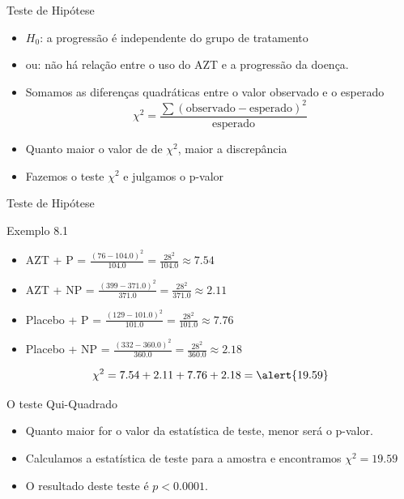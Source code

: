 \documentclass{beamer}
\begin{document}
\begin{frame}{Teste de Hipótese}
  \begin{itemize}
    \small
  \item $H_0$: a progressão é independente do grupo de tratamento
  \item ou: não há relação entre o uso do AZT e a progressão da doença.
    \bigskip
    \scriptsize
  \item Somamos as diferenças quadráticas entre o valor observado
    e o esperado
    \begin{displaymath}
      \chi^2 = \frac{\sum (\text{observado} - \text{esperado})^2 }{\text{esperado}}
    \end{displaymath}
    \bigskip
    \footnotesize
  \item Quanto maior o valor de de $\chi^2$, maior a discrepância
  \item Fazemos o teste $\chi^2$ e julgamos o p-valor
  \end{itemize}
\end{frame}

\begin{frame}{Teste de Hipótese}
  \begin{exampleblock}{Exemplo 8.1}
    \begin{itemize}
      \scriptsize
    \item AZT + P = $\frac{(76 - 104.0)^2}{104.0} = \frac{28^2}{104.0}
      \approx 7.54$
    \item AZT + NP = $\frac{(399 - 371.0)^2}{371.0} =
      \frac{28^2}{371.0} \approx 2.11$
    \item Placebo + P = $\frac{(129 - 101.0)^2}{101.0} =
      \frac{28^2}{101.0} \approx 7.76$
    \item Placebo + NP = $\frac{(332 - 360.0)^2}{360.0} =
      \frac{28^2}{360.0} \approx 2.18$
    \end{itemize}
    \small
    \bigskip
    \begin{exampleblock}{}
      $$\chi^2 = 7.54 + 2.11 + 7.76 + 2.18 = \alert{19.59}$$
    \end{exampleblock}
  \end{exampleblock}
\end{frame}

\begin{frame}{O teste Qui-Quadrado}
  \begin{itemize}
    \small
  \item Quanto \alert{maior} for o valor da estatística de teste,
    \alert{menor} será o p-valor.
  \item Calculamos a estatística de teste para a amostra e encontramos
    $\chi^2 = 19.59$
  \item O resultado deste teste é $p<0.0001$.
  \end{itemize}
\end{frame}
\end{document}
